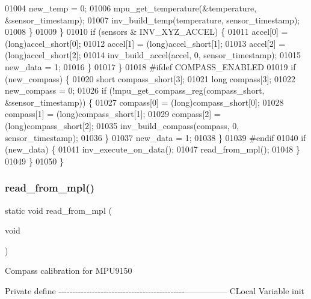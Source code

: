 \begin{DoxyCode}
01004                     new\_temp = 0;
01006                     mpu\_get\_temperature(&temperature, &sensor\_timestamp);
01007                     inv\_build\_temp(temperature, sensor\_timestamp);
01008                 \}
01009             \}
01010             \textcolor{keywordflow}{if} (sensors & INV\_XYZ\_ACCEL) \{
01011                 accel[0] = (long)accel\_short[0];
01012                 accel[1] = (long)accel\_short[1];
01013                 accel[2] = (long)accel\_short[2];
01014                 inv\_build\_accel(accel, 0, sensor\_timestamp);
01015                 new\_data = 1;
01016             \}
01017         \}
01018 \textcolor{preprocessor}{#ifdef COMPASS\_ENABLED}
01019         \textcolor{keywordflow}{if} (new\_compass) \{
01020             \textcolor{keywordtype}{short} compass\_short[3];
01021             \textcolor{keywordtype}{long} compass[3];
01022             new\_compass = 0;
01026             \textcolor{keywordflow}{if} (!mpu\_get\_compass\_reg(compass\_short, &sensor\_timestamp)) \{
01027                 compass[0] = (long)compass\_short[0];
01028                 compass[1] = (long)compass\_short[1];
01029                 compass[2] = (long)compass\_short[2];
01035                 inv\_build\_compass(compass, 0, sensor\_timestamp);
01036             \}
01037             new\_data = 1;
01038         \}
01039 \textcolor{preprocessor}{#endif}
01040         \textcolor{keywordflow}{if} (new\_data) \{
01041             inv\_execute\_on\_data();
01047             read_from_mpl();
01048         \}
01049     \}
01050 \}
\end{DoxyCode}
\mbox{\label{group__eMPL_ga6a14df92edfa4e41346035ca5bf0d991}} 
\subsubsection{read\+\_\+from\+\_\+mpl()}
{\footnotesize\ttfamily static void read\+\_\+from\+\_\+mpl (\begin{DoxyParamCaption}\item[{void}]{ }\end{DoxyParamCaption})\hspace{0.3cm}{\ttfamily [static]}}

Compass calibration for M\+P\+U9150

Private define -\/-\/-\/-\/-\/-\/-\/-\/-\/-\/-\/-\/-\/-\/-\/-\/-\/-\/-\/-\/-\/-\/-\/-\/-\/-\/-\/-\/-\/-\/-\/-\/-\/-\/-\/-\/-\/-\/-\/-\/-\/-\/-\/-\/-\/--------------- C\+Local Variable init

